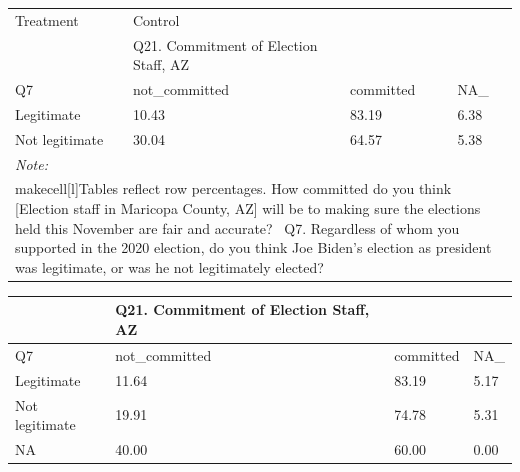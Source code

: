\documentclass[
  11pt,
  a4paper,
]{article}
\begin{document}
\begin{table}
\centering
\centering
\begin{tabular}[t]{l|l|l|l}
\hline
\multicolumn{1}{l|}{Treatment} & \multicolumn{1}{l}{Control} \\
\cline{1-1} \cline{2-2}
 & Q21. Commitment of Election Staff, AZ &  & \\
\hline
Q7 & not\_committed & committed & NA\_\\
\hline
Legitimate & 10.43 & 83.19 & 6.38\\
\hline
Not legitimate & 30.04 & 64.57 & 5.38\\
\hline
\multicolumn{4}{l}{\rule{0pt}{1em}\textit{Note: }}\\
\multicolumn{4}{l}{\rule{0pt}{1em}makecell[l]{Tables reflect row percentages\Q21. How committed do you think [Election staff in Maricopa County, AZ] will be to making sure the elections held this November are fair and accurate? \ Q7. Regardless of whom you supported in the 2020 election, do you think Joe Biden's election as president was legitimate, or was he not legitimately elected?}}\\
\end{tabular}
\centering
\begin{tabular}[t]{l|l|l|l}
\hline
 & Q21. Commitment of Election Staff, AZ &  & \\
\hline
Q7 & not\_committed & committed & NA\_\\
\hline
Legitimate & 11.64 & 83.19 & 5.17\\
\hline
Not legitimate & 19.91 & 74.78 & 5.31\\
\hline
NA & 40.00 & 60.00 & 0.00\\
\hline
\end{tabular}
\end{table}
\end{document}
